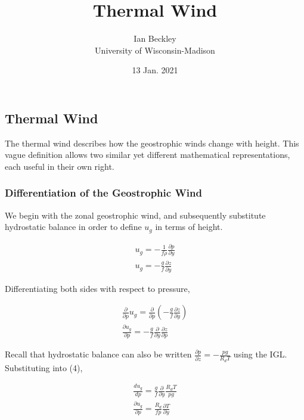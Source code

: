 \documentclass[a4paper,12pt]{article}
\begin{document}
\title{\vspace{-4.0cm}Thermal Wind}
\author{Ian Beckley
\\University of Wisconsin-Madison}

\date{13 Jan. 2021}

\maketitle

\subsection*{Thermal Wind}

The thermal wind describes how the geostrophic winds change with height. This vague definition allows two similar yet different mathematical representations, each useful in their own right. 

\subsubsection*{Differentiation of the Geostrophic Wind}

We begin with the zonal geostrophic wind, and subsequently substitute hydrostatic balance in order to define $u_g$ in terms of height.

\begin{align}
u_g = -\frac{1}{f\rho}\frac{\partial p}{\partial y}\\
u_g = -\frac{g}{f}\frac{\partial z}{\partial y}
\end{align}

Differentiating both sides with respect to pressure,

\begin{align}
\frac{\partial}{\partial p} u_g = \frac{\partial}{\partial p}(-\frac{g}{f}\frac{\partial z}{\partial y})\\
\frac{\partial u_g}{\partial p} = -\frac{g}{f}\frac{\partial}{\partial y}\frac{\partial z}{\partial p}
\end{align}

Recall that hydrostatic balance can also be written $\frac{\partial p}{\partial z} = -\frac{pg}{R_d T}$ using the IGL. Substituting into (4),

\begin{align}
\frac{du_g}{dp} = \frac{g}{f}\frac{\partial}{\partial y}\frac{R_d T}{pg}\\
\frac{\partial u_g}{\partial p} = \frac{R_d}{fp}\frac{\partial T}{\partial y}
\end{align}
\end{document}
